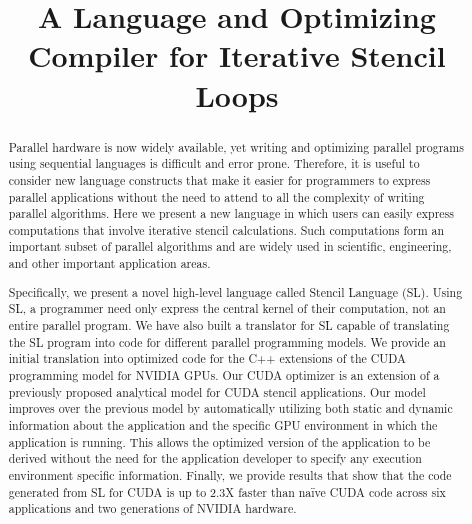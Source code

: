 \documentclass[preprint,nocopyrightspace]{styles/sigplanconf}
\begin{document}
\copyrightdata{[to be supplied]} 


\title{\vskip-0.1in{}A Language and Optimizing Compiler for Iterative Stencil Loops \\[-0.55in]}

\authorinfo{}{}{}

\maketitle

\begin{abstract}

Parallel hardware is now widely available, yet writing and optimizing
parallel programs using sequential languages is difficult and error prone.
Therefore, it is useful to consider new language constructs that make it easier
for programmers to express parallel applications without the need to attend to
all the complexity of writing parallel algorithms.  Here we present a new
language in which users can easily express computations that involve iterative
stencil calculations.  Such computations form an important subset of parallel
algorithms and are widely used in scientific, engineering, and other important
application areas.

Specifically, we present a novel high-level language called Stencil Language
(SL).  Using SL, a programmer need only express the central kernel of their
computation, not an entire parallel program.  We have also built a
translator for SL capable of translating the SL program into code for different
parallel programming models.  We provide an initial translation into optimized
code for the C++ extensions of the CUDA programming model for NVIDIA GPUs.  Our
CUDA optimizer is an extension of a previously proposed analytical model for
CUDA stencil applications.  Our model improves over the previous model by
automatically utilizing both static and dynamic information about the
application and the specific GPU environment in which the application is
running.  This allows the optimized version of the application to be derived
without the need for the application developer to specify any execution
environment specific information.  Finally, we provide results that show that
the code generated from SL for CUDA is up to 2.3X faster than na\"{i}ve CUDA code
across six applications and two generations of NVIDIA hardware.

\end{abstract}
\end{document}
